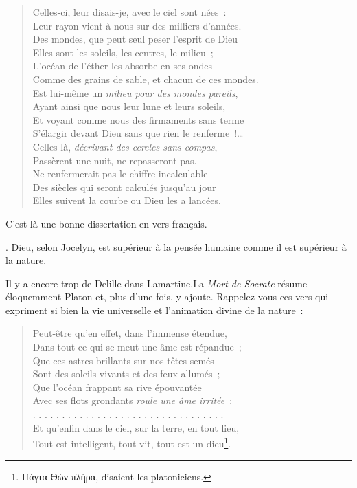 \documentclass[french,twoside]{book} %
\begin{document}
{\begin{verse}
Celles-ci, leur disais-je, avec le ciel sont nées :\\
Leur rayon vient à nous sur des milliers d’années.\\
Des mondes, que peut seul peser l’esprit de Dieu\\
Elles sont les soleils, les centres, le milieu ;\\
L’océan de l’éther les absorbe en ses ondes\\
Comme des grains de sable, et chacun de ces mondes.\\
Est lui-même un\emph{ milieu pour des mondes pareils},\\
 Ayant ainsi que nous leur lune et leurs soleils,\\
 Et voyant comme nous des firmaments sans terme\\
 S’élargir devant Dieu sans que rien le renferme !…\\
 Celles-là, \emph{décrivant des cercles sans compas},\\
 Passèrent une nuit, ne repasseront pas.\\
 Ne renfermerait pas le chiffre incalculable\\
 Des siècles qui seront calculés jusqu’au jour\\
 Elles suivent la courbe ou Dieu les a lancées.\\
\end{verse}
 \par
\noindent C’est là une bonne dissertation en vers français.
}. Dieu, selon Jocelyn, est supérieur à la pensée humaine comme il est supérieur à la nature.\par
Il y a encore trop de Delille dans Lamartine.La \emph{Mort de Socrate} résume éloquemment Platon et, plus d’une fois, y ajoute. Rappelez-vous ces vers qui expriment si bien la vie universelle et l’animation divine de la nature :\par


\begin{verse}
Peut-être qu’en effet, dans l’immense étendue,\\
Dans tout ce qui se meut une âme est répandue ;\\
Que ces astres brillants sur nos têtes semés\\
Sont des soleils vivants et des feux allumés ;\\
Que l’océan frappant sa rive épouvantée\\
Avec ses flots grondants \emph{roule une âme irritée} ;\\
. . . . . . . . . . . . . . . . . . . . . . . . . . . . . . . . .\\
Et qu’enfin dans le ciel, sur la terre, en tout lieu,\\
Tout est intelligent, tout vit, tout est un dieu\footnote{Πάγτα ϴών πλήρα, disaient les platoniciens.}.\\
\end{verse}
\end{document}
